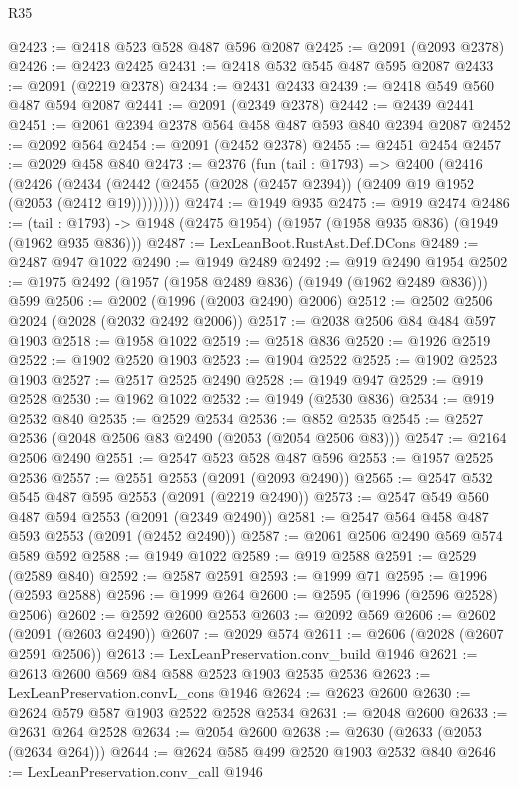 \begin{lexlean}{R35}
\begin{coremodule}
@2423 := @2418 @523 @528 @487 @596 @2087
@2425 := @2091 (@2093 @2378)
@2426 := @2423 @2425
@2431 := @2418 @532 @545 @487 @595 @2087
@2433 := @2091 (@2219 @2378)
@2434 := @2431 @2433
@2439 := @2418 @549 @560 @487 @594 @2087
@2441 := @2091 (@2349 @2378)
@2442 := @2439 @2441
@2451 := @2061 @2394 @2378 @564 @458 @487 @593 @840 @2394 @2087
@2452 := @2092 @564
@2454 := @2091 (@2452 @2378)
@2455 := @2451 @2454
@2457 := @2029 @458 @840
@2473 := @2376
    (fun (tail : @1793) =>
    @2400
      (@2416
        (@2426
          (@2434 (@2442 (@2455 (@2028 (@2457 @2394)) (@2409 @19 @1952 (@2053 (@2412 @19)))))))))
@2474 := @1949 @935
@2475 := @919 @2474
@2486 := (tail : @1793) -> @1948 (@2475 @1954) (@1957 (@1958 @935 @836) (@1949 (@1962 @935 @836)))
@2487 := LexLeanBoot.RustAst.Def.DCons
@2489 := @2487 @947 @1022
@2490 := @1949 @2489
@2492 := @919 @2490 @1954
@2502 := @1975 @2492 (@1957 (@1958 @2489 @836) (@1949 (@1962 @2489 @836))) @599
@2506 := @2002 (@1996 (@2003 @2490) @2006)
@2512 := @2502 @2506 @2024 (@2028 (@2032 @2492 @2006))
@2517 := @2038 @2506 @84 @484 @597 @1903
@2518 := @1958 @1022
@2519 := @2518 @836
@2520 := @1926 @2519
@2522 := @1902 @2520 @1903
@2523 := @1904 @2522
@2525 := @1902 @2523 @1903
@2527 := @2517 @2525 @2490
@2528 := @1949 @947
@2529 := @919 @2528
@2530 := @1962 @1022
@2532 := @1949 (@2530 @836)
@2534 := @919 @2532 @840
@2535 := @2529 @2534
@2536 := @852 @2535
@2545 := @2527 @2536 (@2048 @2506 @83 @2490 (@2053 (@2054 @2506 @83)))
@2547 := @2164 @2506 @2490
@2551 := @2547 @523 @528 @487 @596
@2553 := @1957 @2525 @2536
@2557 := @2551 @2553 (@2091 (@2093 @2490))
@2565 := @2547 @532 @545 @487 @595 @2553 (@2091 (@2219 @2490))
@2573 := @2547 @549 @560 @487 @594 @2553 (@2091 (@2349 @2490))
@2581 := @2547 @564 @458 @487 @593 @2553 (@2091 (@2452 @2490))
@2587 := @2061 @2506 @2490 @569 @574 @589 @592
@2588 := @1949 @1022
@2589 := @919 @2588
@2591 := @2529 (@2589 @840)
@2592 := @2587 @2591
@2593 := @1999 @71
@2595 := @1996 (@2593 @2588)
@2596 := @1999 @264
@2600 := @2595 (@1996 (@2596 @2528) @2506)
@2602 := @2592 @2600 @2553
@2603 := @2092 @569
@2606 := @2602 (@2091 (@2603 @2490))
@2607 := @2029 @574
@2611 := @2606 (@2028 (@2607 @2591 @2506))
@2613 := LexLeanPreservation.conv_build @1946
@2621 := @2613 @2600 @569 @84 @588 @2523 @1903 @2535 @2536
@2623 := LexLeanPreservation.convL_cons @1946
@2624 := @2623 @2600
@2630 := @2624 @579 @587 @1903 @2522 @2528 @2534
@2631 := @2048 @2600
@2633 := @2631 @264 @2528
@2634 := @2054 @2600
@2638 := @2630 (@2633 (@2053 (@2634 @264)))
@2644 := @2624 @585 @499 @2520 @1903 @2532 @840
@2646 := LexLeanPreservation.conv_call @1946

\end{coremodule}
\end{lexlean}
